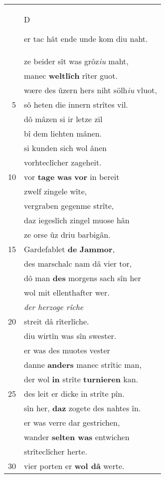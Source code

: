 \documentclass[8pt,a4paper,notitlepage]{article}
\begin{document}
\begin{table}[ht]
\begin{minipage}[t]{0.5\linewidth}
\begin{center}
\end{center}
\begin{tabular}{rl}
 & \begin{large}D\end{large}er tac hât ende unde kom diu naht.\\ 
 & ze beider sît was grôz\textit{iu} maht,\\ 
 & manec \textbf{weltlîch} rîter guot.\\ 
 & wære des ûzern hers niht sölh\textit{iu} vluot,\\ 
5 & sô heten die innern strîtes vil.\\ 
 & dô mâzen si ir letze zil\\ 
 & bî dem liehten mânen.\\ 
 & si kunden sich wol ânen\\ 
 & vorhteclîcher zageheit.\\ 
10 & vor \textbf{tage} \textbf{was} \textbf{vor} in bereit\\ 
 & zwelf zingele wîte,\\ 
 & vergraben gegenme strîte,\\ 
 & daz iegeslîch zingel muose hân\\ 
 & ze orse ûz driu barbigân.\\ 
15 & Gardefablet \textbf{de} \textbf{Jammor},\\ 
 & des marschalc nam dâ vier tor,\\ 
 & dô man \textbf{des} morgens sach sîn her\\ 
 & wol mit ellenthafter wer.\\ 
 & \textit{der herzoge rîche}\\ 
20 & streit dâ rîterlîche.\\ 
 & diu wirtîn was sîn swester.\\ 
 & er was des muotes vester\\ 
 & danne \textbf{anders} manec strîtic man,\\ 
 & der wol \textbf{in} strîte \textbf{turnieren} kan.\\ 
25 & des leit er dicke in strîte pîn.\\ 
 & sîn her, \textbf{daz} zogete des nahtes în.\\ 
 & er was verre dar gestrichen,\\ 
 & wander \textbf{selten was} entwichen\\ 
 & strîteclîcher herte.\\ 
30 & vier porten er \textbf{wol dâ} werte.\\ 
\end{tabular}

\end{minipage}
\end{table}
\end{document}
